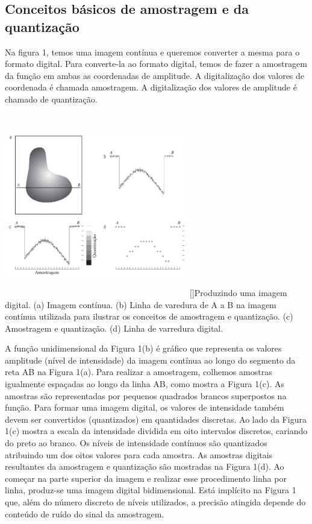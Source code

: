 \documentclass[a4paper,11pt]{article}
\newenvironment{Figure}
  {\par\medskip\noindent\minipage{\linewidth}}
    {\endminipage\par\medskip}
\begin{document}
\begin{multicols}{2}
\subsection{Conceitos básicos de amostragem e da quantização}
Na figura 1, temos uma imagem contínua e queremos converter a mesma para o formato digital. Para converte-la ao formato digital, temos de fazer a amostragem da função em ambas as coordenadas de amplitude. A digitalização dos valores de coordenada é chamada amostragem. A digitalização dos valores de amplitude é chamado de quantização.
\begin{Figure}
	\centering 
	\includegraphics[width=8cm, height=8cm]{figura1}
	[]{Produzindo uma imagem digital. (a) Imagem contínua. (b) Linha de varedura de A a B na imagem contínua utilizada para ilustrar os conceitos de amostragem e quantização. (c) Amostragem e quantização. (d) Linha de varredura digital.}
	\label{medium}
\end{Figure}
A função unidimensional da Figura 1(b) é gráfico que representa os valores amplitude (nível de intensidade) da imagem contínua ao longo do segmento da reta AB na Figura 1(a). Para realizar a amostragem, colhemos amostras igualmente espaçadas ao longo da linha AB, como mostra a Figura 1(c). As amostras são representadas por pequenos quadrados brancos superpostos na função. Para formar uma imagem digital, os valores de intensidade também devem ser convertidos (quantizados) em quantidades discretas. Ao lado da Figura 1(c) mostra a escala da intensidade dividida em oito intervalos discretos, cariando do preto ao branco. Os níveis de intensidade contínuos são quantizados atribuindo um dos oitos valores para cada amostra. As amostras digitais resultantes da amostragem e quantização são mostradas na Figura 1(d). Ao começar na parte superior da imagem e realizar esse procedimento linha por linha, produz-se uma imagem digital bidimensional. Está implícito na Figura 1 que, além do número discreto de níveis utilizados, a precisão atingida depende do conteúdo de ruído do sinal da amostragem.

\end{multicols}
\end{document}
